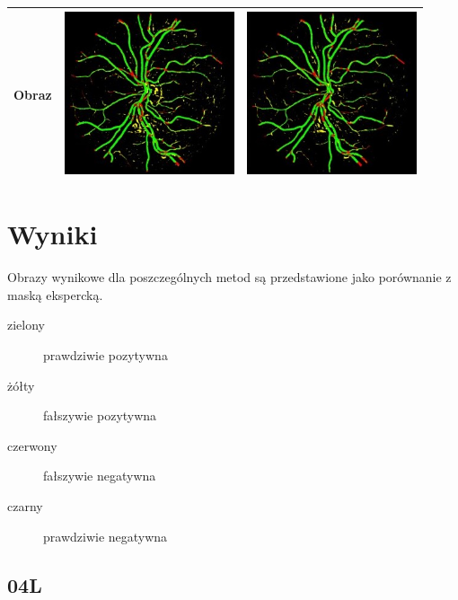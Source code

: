 \documentclass[polish,polish,a4paper]{article}
\begin{document}
\begin{center}
\begin{tabular}{|r|c|c|}
Obraz             & \includegraphics[width=5cm]{./dane/box17.jpg} & \includegraphics[width=5cm]{./dane/box19.jpg} \\ \hline
\end{tabular}
\end{center}	
		
	\section{Wyniki}
		Obrazy wynikowe dla poszczególnych metod są przedstawione jako porównanie z maską ekspercką.
		\begin{description}
			\item [zielony] prawdziwie pozytywna
			\item [żółty] fałszywie pozytywna
			\item [czerwony] fałszywie negatywna
			\item [czarny] prawdziwie negatywna
		\end{description}
\newpage
	
		\subsection{04L}
\end{document}
